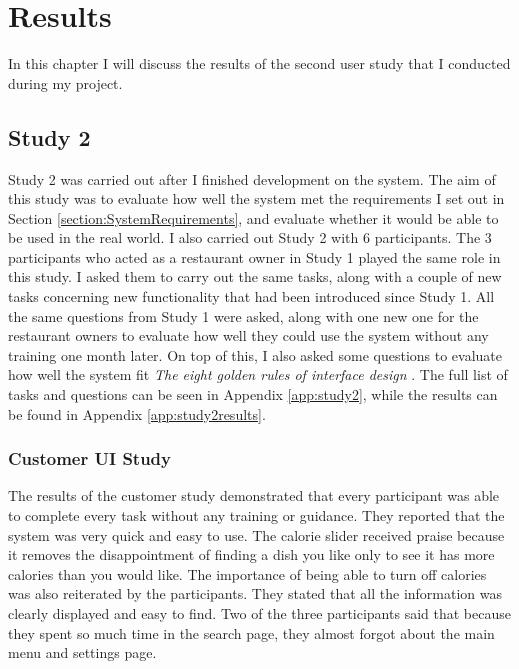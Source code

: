 \chapter{Results}

In this chapter I will discuss the results of the second user study that I conducted during my project.

\section{Study 2}
\label{section:Study2Results}

Study 2 was carried out after I finished development on the system. The aim of this study was to evaluate how well the system met the requirements I set out in Section \ref{section:SystemRequirements}, and evaluate whether it would be able to be used in the real world. I also carried out Study 2 with 6 participants. The 3 participants who acted as a restaurant owner in Study 1 played the same role in this study. I asked them to carry out the same tasks, along with a couple of new tasks concerning new functionality that had been introduced since Study 1. All the same questions from Study 1 were asked, along with one new one for the restaurant owners to evaluate how well they could use the system without any training one month later. On top of this, I also asked some questions to evaluate how well the system fit \textit{The eight golden rules of interface design} \cite{shneiderman}. The full list of tasks and questions can be seen in Appendix \ref{app:study2}, while the results can be found in Appendix \ref{app:study2results}.

\subsection{Customer UI Study}

The results of the customer study demonstrated that every participant was able to complete every task without any training or guidance. They reported that the system was very quick and easy to use. The calorie slider received praise because it removes the disappointment of finding a dish you like only to see it has more calories than you would like. The importance of being able to turn off calories was also reiterated by the participants. They stated that all the information was clearly displayed and easy to find. Two of the three participants said that because they spent so much time in the search page, they almost forgot about the main menu and settings page.

